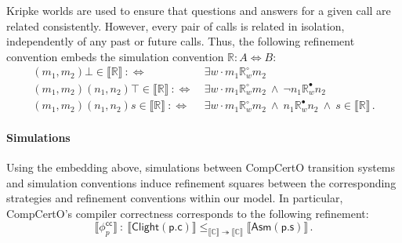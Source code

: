 \documentclass[acmsmall,screen,review,anonymous,nonacm]{acmart}
\newcommand{\kw}[1]{\ensuremath{ \mathsf{#1} }}
\newcommand{\que}{\circ}
\newcommand{\ans}{\bullet}
\begin{document}
Kripke worlds are used to ensure that
questions and answers for a given call
are related consistently.
However, every pair of calls
is related in isolation,
independently of any past or future calls.
Thus, the following
refinement convention
embeds the simulation convention $\mathbb{R} : A \Leftrightarrow B$:
\begin{align*}
  (m_1, m_2) \bot \in \llbracket \mathbb{R} \rrbracket \: :\Leftrightarrow \: {}
   &\exists w \cdot m_1 \mathbb{R}^\que_w m_2
  \\
  (m_1, m_2) (n_1, n_2) \top \in \llbracket \mathbb{R} \rrbracket \::\Leftrightarrow\: {}
   &\exists w \cdot m_1 \mathbb{R}^\que_w m_2 \:\wedge\:
   \neg n_1 \mathbb{R}^\ans_w n_2
  \\
  (m_1, m_2) (n_1, n_2) s \in \llbracket \mathbb{R} \rrbracket \::\Leftrightarrow\: {}
   &\exists w \cdot m_1 \mathbb{R}^\que_w m_2 \:\wedge\:
   n_1 \mathbb{R}^\ans_w n_2 \:\wedge\:
     s \in \llbracket \mathbb{R} \rrbracket
  \,.
\end{align*}

\paragraph{Simulations}

Using the embedding above,
simulations between CompCertO transition systems and simulation conventions
induce refinement squares between 
the corresponding strategies and refinement conventions within our model.
In particular,
CompCertO's compiler correctness
corresponds to the following refinement:
\[
  \llbracket \phi_p^\kw{cc} \rrbracket \: : \:
      \llbracket \kw{Clight}(\kw{p.c}) \rrbracket
      \le_{\llbracket \mathbb{C} \rrbracket
        \twoheadrightarrow \llbracket\mathbb{C}\rrbracket}
      \llbracket \kw{Asm}(\kw{p.s}) \rrbracket
  \,.
\]
\end{document}

